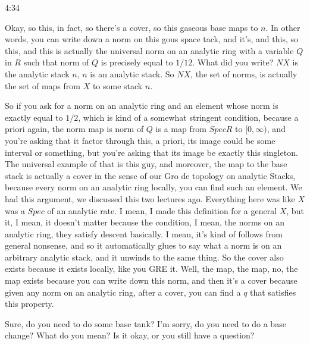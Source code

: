 \begin{unfinished}{4:34}
\begin{example}
Okay, so this, in fact, so there's a cover, so this gaseous base maps to $n$. In other words, you can write down a norm on this gous space tack, and it's, and this, so this, and this is actually the universal norm on an analytic ring with a variable $Q$ in $R$ such that norm of $Q$ is precisely equal to $1/12$. What did you write? $NX$ is the analytic stack $n$, $n$ is an analytic stack. So $NX$, the set of norms, is actually the set of maps from $X$ to some stack $n$.

So if you ask for a norm on an analytic ring and an element whose norm is exactly equal to $1/2$, which is kind of a somewhat stringent condition, because a priori again, the norm map is norm of $Q$ is a map from $Spec R$ to $[0, \infty)$, and you're asking that it factor through this, a priori, its image could be some interval or something, but you're asking that its image be exactly this singleton. The universal example of that is this guy, and moreover, the map to the base stack is actually a cover in the sense of our Gro de topology on analytic Stacks, because every norm on an analytic ring locally, you can find such an element. We had this argument, we discussed this two lectures ago. Everything here was like $X$ was a $Spec$ of an analytic rate. I mean, I made this definition for a general $X$, but it, I mean, it doesn't matter because the condition, I mean, the norms on an analytic ring, they satisfy descent basically. I mean, it's kind of follows from general nonsense, and so it automatically glues to say what a norm is on an arbitrary analytic stack, and it unwinds to the same thing. So the cover also exists because it exists locally, like you GRE it. Well, the map, the map, no, the map exists because you can write down this norm, and then it's a cover because given any norm on an analytic ring, after a cover, you can find a $q$ that satisfies this property.

Sure, do you need to do some base tank? I'm sorry, do you need to do a base change? What do you mean? Is it okay, or you still have a question?


\end{example}
\end{unfinished}
